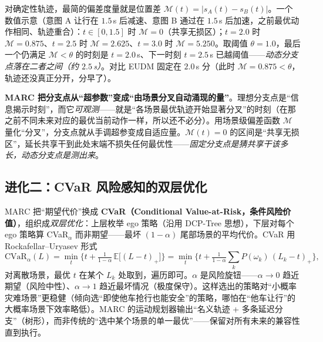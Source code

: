 对确定性轨迹，最简的偏差度量就是位置差 $\mathcal{M}(t)=|s_A(t)-s_B(t)|$。一个数值示意（意图 A 让行在 $1.5\,$s 后减速、意图 B 通过在 $1.5\,$s 后加速，之前最优动作相同、轨迹重合）：$t\in[0,1.5]$ 时 $\mathcal{M}=0$（共享无损区）；$t=2.0$ 时 $\mathcal{M}=0.875$、$t=2.5$ 时 $\mathcal{M}=2.625$、$t=3.0$ 时 $\mathcal{M}=5.250$。取阈值 $\theta=1.0$，最后一个仍满足 $\mathcal{M}<\theta$ 的时刻是 $t=2.0\,$s、下一时刻 $t=2.5\,$s 已越阈值——\emph{动态分支点落在二者之间（约 $2.5\,$s）}。对比 EUDM 固定在 $2.0\,$s 分（此时 $\mathcal{M}=0.875<\theta$，轨迹还没真正分开，分早了）。

\begin{insight}
\textbf{MARC 把分支点从“超参数”变成“由场景分叉自动涌现的量”}。理想分支点是“信息揭示时刻”，而它\emph{可观测}——就是“各场景最优轨迹开始显著分叉”的时刻（在那之前不同未来对应的最优当前动作一样，所以还不必分）。用场景级偏差函数 $\mathcal{M}$ 量化“分叉”，分支点就从手调超参变成自适应量。$\mathcal{M}(t)=0$ 的区间是“共享无损区”，延长共享干到此处末端不损失任何最优性——\emph{固定分支点是猜共享干该多长，动态分支点是测出来}。
\end{insight}

\subsection{进化二：CVaR 风险感知的双层优化}
\label{sec:pr-marc-cvar}

MARC 把“期望代价”换成 \textbf{CVaR（Conditional Value-at-Risk，条件风险价值）}，组织成\emph{双层优化}\cite{li2023marc}：上层枚举 ego 策略（沿用 DCP-Tree 思想），下层对每个 ego 策略算 CVaR$_\alpha$ 而非期望——最坏 $(1-\alpha)$ 尾部场景的平均代价。CVaR 用 Rockafellar--Uryasev 形式\cite{rockafellar2000cvar}
\begin{equation}
  \mathrm{CVaR}_\alpha(L)=\min_{t}\Big\{t+\tfrac{1}{1-\alpha}\,\mathbb{E}\big[(L-t)_+\big]\Big\}
  =\min_{t}\Big\{t+\tfrac{1}{1-\alpha}\sum_k P(\omega_k)\,(L_k-t)_+\Big\},
  \label{eq:pr-cvar}
\end{equation}
对离散场景，最优 $t$ 在某个 $L_k$ 处取到，遍历即可。$\alpha$ 是风险旋钮——$\alpha\to 0$ 趋近期望（风险中性）、$\alpha\to 1$ 趋近最坏情况（极度保守）。这样选出的策略对“小概率灾难场景”更稳健（倾向选“即使他车抢行也能安全”的策略，哪怕在“他车让行”的大概率场景下效率略低）。MARC 的运动规划器输出“名义轨迹 + 多条延迟分支”（树形），而非传统的“选中某个场景的单一最优”——保留对所有未来的兼容性直到执行。


